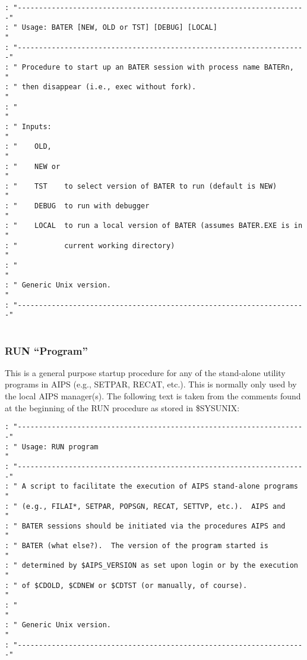 \begin{verbatim}
: "--------------------------------------------------------------------"
: " Usage: BATER [NEW, OLD or TST] [DEBUG] [LOCAL]                     "
: "--------------------------------------------------------------------"
: " Procedure to start up an BATER session with process name BATERn,   "
: " then disappear (i.e., exec without fork).                          "
: "                                                                    "
: " Inputs:                                                            "
: "    OLD,                                                            "
: "    NEW or                                                          "
: "    TST    to select version of BATER to run (default is NEW)       "
: "    DEBUG  to run with debugger                                     "
: "    LOCAL  to run a local version of BATER (assumes BATER.EXE is in "
: "           current working directory)                               "
: "                                                                    "
: " Generic Unix version.                                              "
: "--------------------------------------------------------------------"


\end{verbatim}

\subsubsection{RUN ``Program''}
This is a general purpose startup procedure for any of the stand-alone
utility programs in AIPS (e.g., SETPAR, RECAT, etc.).  This is
normally only used by the local AIPS manager(s).  The following text
is taken from the comments found at the beginning of the RUN procedure
as stored in \$SYSUNIX:

\begin{verbatim}
: "--------------------------------------------------------------------"
: " Usage: RUN program                                                 "
: "--------------------------------------------------------------------"
: " A script to facilitate the execution of AIPS stand-alone programs  "
: " (e.g., FILAI*, SETPAR, POPSGN, RECAT, SETTVP, etc.).  AIPS and     "
: " BATER sessions should be initiated via the procedures AIPS and     "
: " BATER (what else?).  The version of the program started is         "
: " determined by $AIPS_VERSION as set upon login or by the execution  "
: " of $CDOLD, $CDNEW or $CDTST (or manually, of course).              "
: "                                                                    "
: " Generic Unix version.                                              "
: "--------------------------------------------------------------------"


\end{verbatim}


